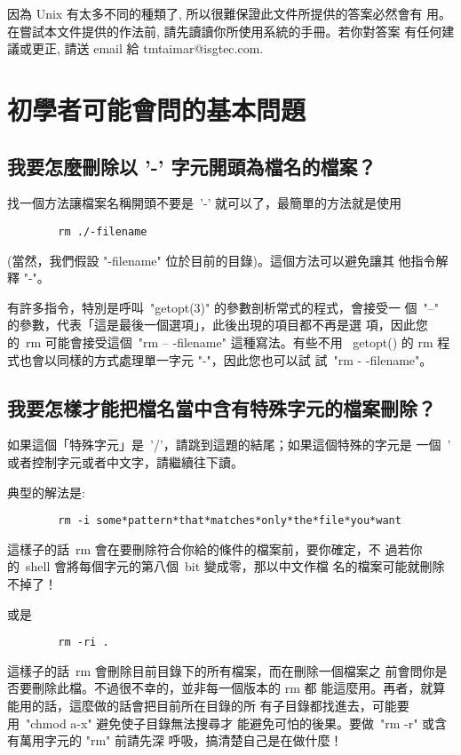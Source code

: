 \documentclass{article}
\begin{document}
\begin{CJK*}{Bg5}{ming}
因為 Unix 有太多不同的種類了, 所以很難保證此文件所提供的答案必然會有
用。在嘗試本文件提供的作法前, 請先讀讀你所使用系統的手冊。若你對答案
有任何建議或更正, 請送 email 給 tmtaimar@isgtec.com.

\section{初學者可能會問的基本問題}
\subsection{我要怎麼刪除以 '-' 字元開頭為檔名的檔案？}

	找一個方法讓檔案名稱開頭不要是~'-' 就可以了，最簡單的方法就是使用
\begin{verbatim}
        rm ./-filename
\end{verbatim}
	(當然，我們假設 "-filename" 位於目前的目錄)。這個方法可以避免讓其
	他指令解釋 "-"。

	有許多指令，特別是呼叫~"getopt(3)" 的參數剖析常式的程式，會接受一
	個~"--" 的參數，代表「這是最後一個選項」，此後出現的項目都不再是選
	項，因此您的~rm 可能會接受這個~"rm -- -filename" 這種寫法。有些不用 
	~getopt() 的 rm 程式也會以同樣的方式處理單一字元 "-"，因此您也可以試
	試~"rm - -filename"。

\subsection{我要怎樣才能把檔名當中含有特殊字元的檔案刪除？}

	如果這個「特殊字元」是~'/'，請跳到這題的結尾；如果這個特殊的字元是
	一個~' 或者控制字元或者中文字，請繼續往下讀。

	典型的解法是:
\begin{verbatim}
        rm -i some*pattern*that*matches*only*the*file*you*want
\end{verbatim}
	這樣子的話~rm 會在要刪除符合你給的條件的檔案前，要你確定，不
	過若你的~shell 會將每個字元的第八個~bit 變成零，那以中文作檔
	名的檔案可能就刪除不掉了！

	或是	
\begin{verbatim}
        rm -ri .
\end{verbatim}
	這樣子的話~rm 會刪除目前目錄下的所有檔案，而在刪除一個檔案之
	前會問你是否要刪除此檔。不過很不幸的，並非每一個版本的 rm 都
	能這麼用。再者，就算能用的話，這麼做的話會把目前所在目錄的所
	有子目錄都找進去，可能要用~"chmod a-x" 避免使子目錄無法搜尋才
	能避免可怕的後果。要做~"rm -r" 或含有萬用字元的 "rm" 前請先深
	呼吸，搞清楚自己是在做什麼！


\end{CJK*}
\end{document}
